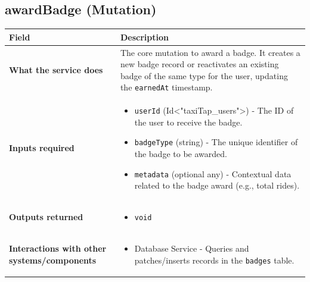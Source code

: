\documentclass[11pt,a4paper]{article}
\begin{document}
\subsection{awardBadge (Mutation)}
\label{sub:awardBadge}
\begin{longtable}{|p{4cm}|p{12cm}|}
\hline
\textbf{Field} & \textbf{Description} \\
\hline
\textbf{What the service does} & 
The core mutation to award a badge. It creates a new badge record or reactivates an existing badge of the same type for the user, updating the \texttt{earnedAt} timestamp. \\
\hline
\textbf{Inputs required} & 
\begin{itemize}[nosep]
\item \texttt{userId} (Id<"taxiTap\_users">) - The ID of the user to receive the badge.
\item \texttt{badgeType} (string) - The unique identifier of the badge to be awarded.
\item \texttt{metadata} (optional any) - Contextual data related to the badge award (e.g., total rides).
\end{itemize} \\
\hline
\textbf{Outputs returned} & 
\begin{itemize}[nosep]
\item \texttt{void}
\end{itemize} \\
\hline
\textbf{Interactions with other systems/components} & 
\begin{itemize}[nosep]
\item Database Service - Queries and patches/inserts records in the \texttt{badges} table.
\end{itemize} \\
\hline
\end{longtable}
\end{document}
